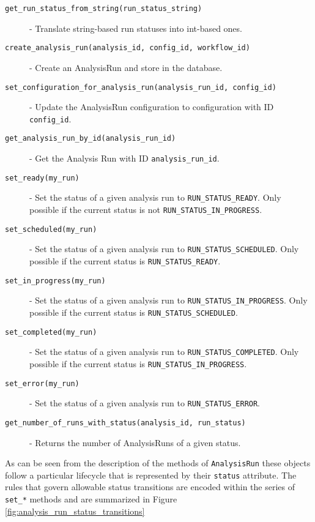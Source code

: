 \begin{description}
\item [\texttt{get_run_status_from_string(run_status_string)}] - Translate string-based run statuses into int-based ones.
\item [\texttt{create_analysis_run(analysis_id, config_id, workflow_id)}] - Create an AnalysisRun and store in the database.
\item [\texttt{set_configuration_for_analysis_run(analysis_run_id, config_id)}] - Update the AnalysisRun configuration to configuration with ID \texttt{config_id}.
\item [\texttt{get_analysis_run_by_id(analysis_run_id)}] - Get the Analysis Run with ID \texttt{analysis_run_id}.
\item [\texttt{set_ready(my_run)}] - Set the status of a given analysis run to \texttt{RUN_STATUS_READY}. Only possible if the current status is not \texttt{RUN_STATUS_IN_PROGRESS}.
\item [\texttt{set_scheduled(my_run)}] - Set the status of a given analysis run to \texttt{RUN_STATUS_SCHEDULED}. Only possible if the current status is \texttt{RUN_STATUS_READY}.
\item [\texttt{set_in_progress(my_run)}] - Set the status of a given analysis run to \texttt{RUN_STATUS_IN_PROGRESS}. Only possible if the current status is \texttt{RUN_STATUS_SCHEDULED}.
\item [\texttt{set_completed(my_run)}] - Set the status of a given analysis run to \texttt{RUN_STATUS_COMPLETED}. Only possible if the current status is \texttt{RUN_STATUS_IN_PROGRESS}.
\item [\texttt{set_error(my_run)}] - Set the status of a given analysis run to \texttt{RUN_STATUS_ERROR}.
\item [\texttt{get_number_of_runs_with_status(analysis_id, run_status)}] - Returns the number of AnalysisRuns of a given status.
\end{description}

As can be seen from the description of the methods of \texttt{AnalysisRun} these objects follow a particular lifecycle that is represented by their \texttt{status} attribute. The rules that govern allowable status transitions are encoded within the series of \texttt{set_*} methods and are summarized in Figure \ref{fig:analysis_run_status_transitions}

